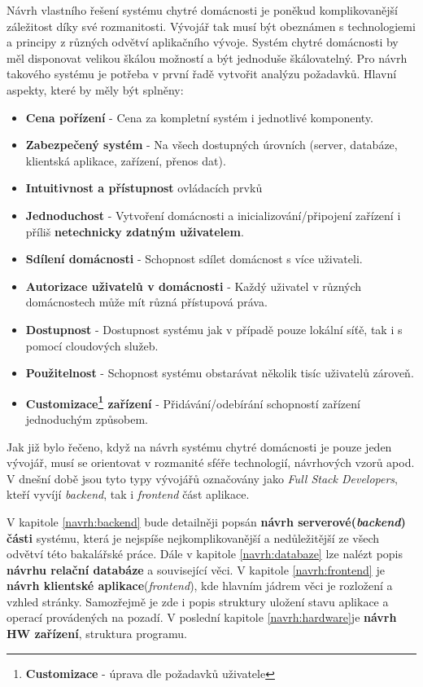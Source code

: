 Návrh vlastního řešení systému chytré domácnosti je poněkud komplikovanější záležitost díky své rozmanitosti.
Vývojář tak musí být obeznámen s technologiemi a principy z různých odvětví aplikačního vývoje.
Systém chytré domácnosti by měl disponovat velikou škálou možností a být jednoduše škálovatelný.
Pro návrh takového systému je potřeba v první řadě vytvořit analýzu požadavků.
\newline
\newline
Hlavní aspekty, které by měly být splněny:
\begin{itemize}
  \item \textbf{Cena pořízení} - Cena za kompletní systém i jednotlivé komponenty.
  \item \textbf{Zabezpečený systém} - Na všech dostupných úrovních (server, databáze, klientská aplikace, zařízení, přenos dat).
  \item \textbf{Intuitivnost a přístupnost} ovládacích prvků
  \item \textbf{Jednoduchost} - Vytvoření domácnosti a inicializování/připojení zařízení i příliš \textbf{netechnicky zdatným uživatelem}.
  \item \textbf{Sdílení domácnosti} - Schopnost sdílet domácnost s více uživateli.
  \item \textbf{Autorizace uživatelů v domácnosti} - Každý uživatel v různých domácnostech může mít různá přístupová práva.
  \item \textbf{Dostupnost} - Dostupnost systému jak v případě pouze lokální síťě, tak i s pomocí cloudových služeb.
  \item \textbf{Použitelnost} - Schopnost systému obstarávat několik tisíc uživatelů zároveň.
  \item \textbf{Customizace\footnote{\textbf{Customizace} - úprava dle požadavků uživatele} zařízení} - Přidávání/odebírání schopností zařízení jednoduchým způsobem.
\end{itemize}
Jak již bylo řečeno, když na návrh systému chytré domácnosti je pouze jeden vývojář, musí se orientovat v rozmanité sféře technologií, návrhových vzorů apod.
V dnešní době jsou tyto typy vývojářů označovány jako \emph{Full Stack Developers}, kteří vyvíjí \emph{backend}, tak i \emph{frontend} část aplikace.

V kapitole \ref{navrh:backend} bude detailněji popsán \textbf{návrh serverové(\emph{backend}) části} systému, která je nejspíše nejkomplikovanější a nedůležitější ze všech odvětví této bakalářské práce.
Dále v kapitole \ref{navrh:databaze} lze nalézt popis \textbf{návrhu relační databáze} a související věci.
V kapitole \ref{navrh:frontend} je \textbf{návrh klientské aplikace}(\emph{frontend}), kde hlavním jádrem věci je rozložení a vzhled stránky.
Samozřejmě je zde i popis struktury uložení stavu aplikace a operací provádených na pozadí.
V poslední kapitole \ref{navrh:hardware}je \textbf{návrh HW zařízení}, struktura programu.
\newpage

